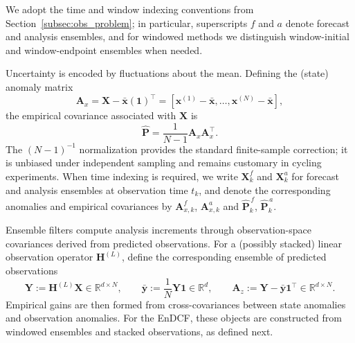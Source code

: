 \documentclass[11pt,a4paper]{article}
\begin{document}
We adopt the time and window indexing conventions from Section~\ref{subsec:obs_problem}; in particular, superscripts $f$ and $a$ denote forecast and analysis ensembles, and for windowed methods we distinguish window-initial and window-endpoint ensembles when needed.

Uncertainty is encoded by fluctuations about the mean. Defining the (state) anomaly matrix
\begin{equation}
\mathbf{A}_{x}
=
\mathbf{X}-\bar{\mathbf{x}}(\mathbf{1})^\top
=
[\mathbf{x}^{(1)}-\bar{\mathbf{x}},\ldots,\mathbf{x}^{(N)}-\bar{\mathbf{x}}],
\label{eq:anomaly_matrix}
\end{equation}
the empirical covariance associated with $\mathbf{X}$ is
\begin{equation}
\widehat{\mathbf{P}}
=
\frac{1}{N-1}\mathbf{A}_{x}\mathbf{A}_{x}^\top.
\label{eq:sample_covariance}
\end{equation}
The $(N-1)^{-1}$ normalization provides the standard finite-sample correction; it is unbiased under independent sampling and remains customary in cycling experiments.
When time indexing is required, we write $\mathbf{X}_k^{f}$ and $\mathbf{X}_k^{a}$ for forecast and analysis ensembles at observation time $t_k$, and denote the corresponding anomalies and empirical covariances by $\mathbf{A}_{x,k}^{f}$, $\mathbf{A}_{x,k}^{a}$ and $\widehat{\mathbf{P}}_{k}^{\,f}$, $\widehat{\mathbf{P}}_{k}^{\,a}$.

Ensemble filters compute analysis increments through observation-space covariances derived from predicted observations. For a (possibly stacked) linear observation operator $\mathbf{H}^{(L)}$, define the corresponding ensemble of predicted observations
\begin{equation}
\mathbf{Y}:=\mathbf{H}^{(L)}\mathbf{X}\in\mathbb{R}^{d\times N},
\qquad
\bar{\mathbf{y}}:=\frac{1}{N}\mathbf{Y}\mathbf{1}\in\mathbb{R}^{d},
\qquad
\mathbf{A}_{z}:=\mathbf{Y}-\bar{\mathbf{y}}\mathbf{1}^\top\in\mathbb{R}^{d\times N}.
\end{equation}
Empirical gains are then formed from cross-covariances between state anomalies and observation anomalies. For the EnDCF, these objects are constructed from windowed ensembles and stacked observations, as defined next.
\end{document}
